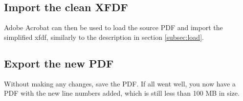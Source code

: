 \documentclass{article}
\begin{document}
\subsection{Import the clean XFDF}
Adobe Acrobat can then be used to load the source PDF and import the
simplified xfdf, similarly to the description in section \ref{subsec:load}.
  
  
\subsection{Export the new PDF}
Without making any changes, save the PDF.
If all went well, you now have a PDF with the new line numbers added,
which is still less than 100 MB in size.
\end{document}
